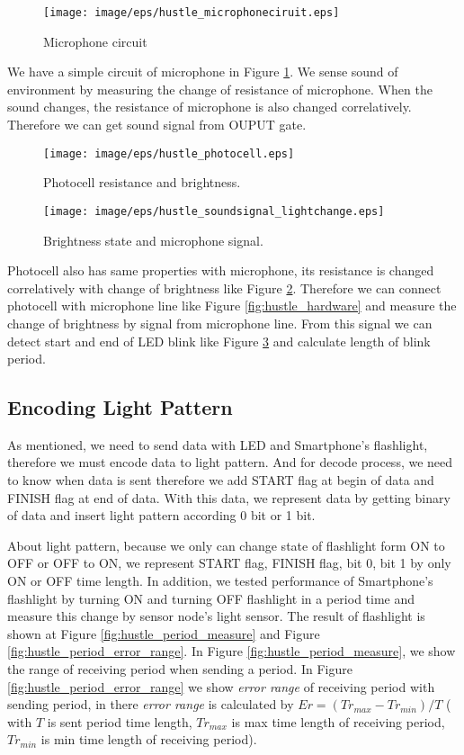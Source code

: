 \begin{figure}[tb]
\centering
\texttt{[image: image/eps/hustle\_microphoneciruit.eps]}
\caption{Microphone circuit}
\label{fig:hustle_microphone}
\end{figure}

We have a simple circuit of microphone in Figure \ref{fig:hustle_microphone}. We sense sound of environment by measuring the change of resistance of microphone. When the sound changes, the resistance of microphone is also changed correlatively. Therefore we can get sound signal from OUPUT gate.

\begin{figure}[tb]
\centering
\texttt{[image: image/eps/hustle\_photocell.eps]}
\caption{Photocell resistance and brightness.}	 	
\label{fig:hustle_photon}
\end{figure}

\begin{figure}[tb]
\centering
\texttt{[image: image/eps/hustle\_soundsignal\_lightchange.eps]}
\caption{Brightness state and microphone signal.}
\label{fig:hustle_resultphoton}
\end{figure}

Photocell also has same properties with microphone, its resistance is changed correlatively with change of brightness like Figure \ref{fig:hustle_photon}. Therefore we can connect photocell with microphone line like Figure \ref{fig:hustle_hardware} and measure the change of brightness by signal from microphone line. From this signal we can detect start and end of LED blink like Figure \ref{fig:hustle_resultphoton} and calculate length of blink period.

\subsection{Encoding Light Pattern}

As mentioned, we need to send data with LED and Smartphone's flashlight, therefore we must encode data to light pattern. And for decode process, we need to know when data is sent therefore we add START flag at begin of data and FINISH flag at end of data. With this data, we represent data by getting binary of data and insert light pattern according 0 bit or 1 bit.

About light pattern, because we only can change state of flashlight form ON to OFF or OFF to ON, we represent START flag, FINISH flag, bit 0, bit 1 by only ON or OFF time length. In addition, we tested performance of Smartphone's flashlight by turning ON and turning OFF flashlight in a period time and measure this change by sensor node's light sensor. The result of flashlight is shown at Figure \ref{fig:hustle_period_measure} and Figure \ref{fig:hustle_period_error_range}. In Figure \ref{fig:hustle_period_measure}, we show the range of receiving period when sending a period. In Figure \ref{fig:hustle_period_error_range} we show \emph{error range} of receiving period with sending period, in there \emph{error range} is calculated by $Er = (Tr_{max} - Tr_{min})/T$ ( with $T$ is sent period time length, $Tr_{max}$ is max time length of receiving period, $Tr_{min}$ is min time length of receiving period). 

